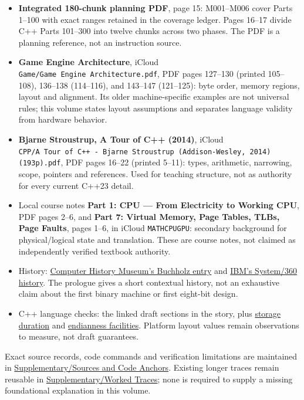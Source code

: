 \begin{itemize}
\tightlist
\item
  \textbf{Integrated 180-chunk planning PDF}, page 15: M001--M006 cover Parts 1--100 with exact ranges retained in the coverage ledger. Pages 16--17 divide C++ Parts 101--300 into twelve chunks across two phases. The PDF is a planning reference, not an instruction source.
\item
  \textbf{Game Engine Architecture}, iCloud \texttt{Game/Game\ Engine\ Architecture.pdf}, PDF pages 127--130 (printed 105--108), 136--138 (114--116), and 143--147 (121--125): byte order, memory regions, layout and alignment. Its older machine-specific examples are not universal rules; this volume states layout assumptions and separates language validity from hardware behavior.
\item
  \textbf{Bjarne Stroustrup, A Tour of C++ (2014)}, iCloud \texttt{CPP/A\ Tour\ of\ C++\ -\ Bjarne\ Stroustrup\ (Addison-Wesley,\ 2014)(193p).pdf}, PDF pages 16--22 (printed 5--11): types, arithmetic, narrowing, scope, pointers and references. Used for teaching structure, not as authority for every current C++23 detail.
\item
  Local course notes \textbf{Part 1: CPU --- From Electricity to Working CPU}, PDF pages 2--6, and \textbf{Part 7: Virtual Memory, Page Tables, TLBs, Page Faults}, pages 1--6, in iCloud \texttt{MATHCPUGPU}: secondary background for physical/logical state and translation. These are course notes, not claimed as independently verified textbook authority.
\item
  History: \href{https://www.computerhistory.org/tdih/october/24/}{Computer History Museum's Buchholz entry} and \href{https://www.ibm.com/history/system-360}{IBM's System/360 history}. The prologue gives a short contextual history, not an exhaustive claim about the first binary machine or first eight-bit design.
\item
  C++ language checks: the linked draft sections in the story, plus \href{https://eel.is/c++draft/basic.stc}{storage duration} and \href{https://eel.is/c++draft/bit.endian}{endianness facilities}. Platform layout values remain observations to measure, not draft guarantees.
\end{itemize}

Exact source records, code commands and verification limitations are maintained in \hyperref[appendix-a103e7846d21]{Supplementary/Sources and Code Anchors}. Existing longer traces remain reusable in \hyperref[appendix-92ff77d4dfdc]{Supplementary/Worked Traces}; none is required to supply a missing foundational explanation in this volume.


